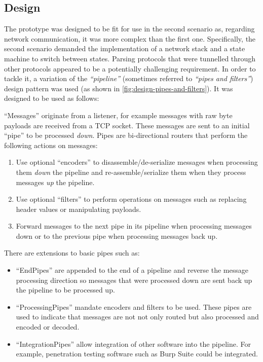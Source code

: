 \subsection{Design}
The prototype was designed to be fit for use in the second scenario as, regarding network communication, it was more complex than the first one. Specifically, the second scenario demanded the implementation of a network stack and a state machine to switch between states.
Parsing protocols that were tunnelled through other protocols appeared to be a potentially challenging requirement. In order to tackle it, a variation of the \emph{\enquote{pipeline}} (sometimes referred to \emph{\enquote{pipes and filters}}) design pattern was used (as shown in \ref{fig:design-pipes-and-filters}). It was designed to be used as follows:\par
\enquote{Messages} originate from a listener, for example messages with raw byte payloads are received from a \ac{TCP} socket. These messages are sent to an initial \enquote{pipe} to be processed \emph{down}.
Pipes are bi-directional routers that perform the following actions on messages:
\begin{enumerate}
    \item Use optional \enquote{encoders} to disassemble/de-serialize messages when processing them \emph{down} the pipeline and re-assemble/serialize them when they process messages \emph{up} the pipeline.
    \item Use optional \enquote{filters} to perform operations on messages such as replacing header values or manipulating payloads.
    \item Forward messages to the next pipe in its pipeline when processing messages down or to the previous pipe when processing messages back up.
\end{enumerate}
There are extensions to basic pipes such as:
\begin{itemize}
    \item \enquote{EndPipes} are appended to the end of a pipeline and reverse the message processing direction so messages that were processed down are sent back up the pipeline to be processed up.
    \item \enquote{ProcessingPipes} mandate encoders and filters to be used. These pipes are used to indicate that messages are not not only routed but also processed and encoded or decoded.
    \item \enquote{IntegrationPipes} allow integration of other software into the pipeline. For example, penetration testing software such as Burp Suite could be integrated.
\end{itemize}

